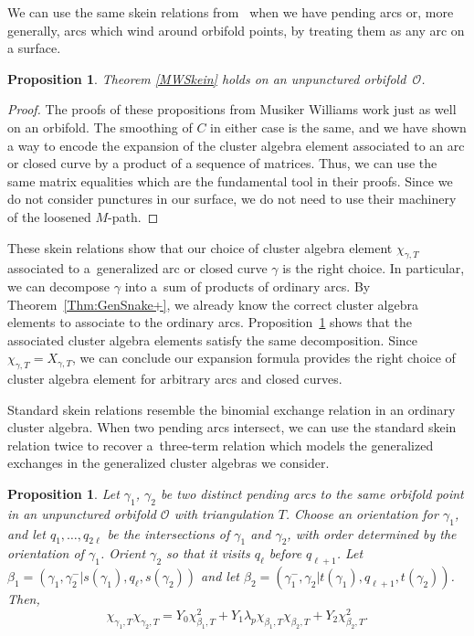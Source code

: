 \documentclass[pdftex]{sigma}%
\numberwithin{equation}{section}
\newtheorem{Proposition}[Theorem]{Proposition}
\begin{document}
We can use the same skein relations from~\cite{MW} when we have pending arcs or, more generally, arcs which wind around orbifold points, by treating them as any arc on a surface.

\begin{Proposition}\label{Prop:OrbSkein}
Theorem {\rm \ref{MWSkein}} holds on an unpunctured orbifold~$\mathcal{O}$.
\end{Proposition}

\begin{proof}
The proofs of these propositions from Musiker Williams work just as well on an orbifold. The smoothing of $C$ in either case is the same, and we have shown a way to encode the expansion of the cluster algebra element associated to an arc or closed curve by a product of a sequence of matrices. Thus, we can use the same matrix equalities \cite[Lemma~6.11]{MW} which are the fundamental tool in their proofs. Since we do not consider punctures in our surface, we do not need to use their machinery of the loosened $M$-path.
\end{proof}

These skein relations show that our choice of cluster algebra element $\chi_{\gamma,T}$ associated to a~generalized arc or closed curve $\gamma$ is the right choice. In particular, we can decompose $\gamma$ into a~sum of products of ordinary arcs. By Theorem~\ref{Thm:GenSnake+}, we already know the correct cluster algebra elements to associate to the ordinary arcs. Proposition~\ref{Prop:OrbSkein} shows that the associated cluster algebra elements satisfy the same decomposition. Since $\chi_{\gamma,T} = X_{\gamma,T}$, we can conclude our expansion formula provides the right choice of cluster algebra element for arbitrary arcs and closed curves.

Standard skein relations resemble the binomial exchange relation in an ordinary cluster algebra. When two pending arcs intersect, we can use the standard skein relation twice to recover a~three-term relation which models the generalized exchanges in the generalized cluster algebras we consider.

\begin{Proposition}\label{prop:OrbSkeinThreeTerm}
Let $\gamma_1$, $\gamma_2$ be two distinct pending arcs to the same orbifold point in an unpunctured orbifold $\mathcal{O}$ with triangulation $T$. Choose an orientation for $\gamma_1$, and let $q_1,\ldots, q_{2\ell}$ be the intersections of $\gamma_1$ and $\gamma_2$, with order determined by the orientation of $\gamma_1$. Orient $\gamma_2$ so that it visits $q_\ell$ before $q_{\ell + 1}$. Let $\beta_1 = (\gamma_1, \gamma_2^- \vert s(\gamma_1), q_\ell, s(\gamma_2))$ and let $\beta_2 = (\gamma_1^-, \gamma_2 \vert t(\gamma_1), q_{\ell + 1}, t(\gamma_2))$. Then, \[
\chi_{\gamma_1,T} \chi_{\gamma_2,T} = Y_0 \chi_{\beta_1,T}^2 + Y_1 \lambda_p \chi_{\beta_1,T} \chi_{\beta_2,T} + Y_2 \chi_{\beta_2,T}^2.
\]
\end{Proposition}
\end{document}
